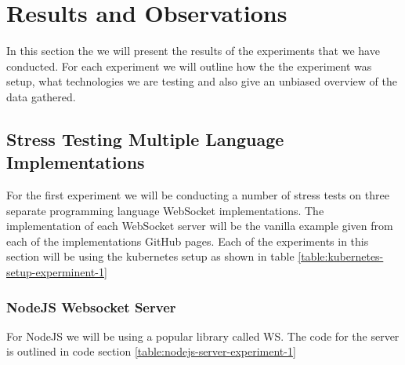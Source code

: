 \chapter{Results and Observations}

In this section the we will present the results of the experiments that we have conducted. For each experiment we will outline how the the experiment was setup, what technologies we are testing and also give an unbiased overview of the data gathered.

\section{Stress Testing Multiple Language Implementations}

For the first experiment we will be conducting a number of stress tests on three separate programming language WebSocket implementations. The implementation of each WebSocket server will be the vanilla example given from each of the implementations GitHub pages. Each of the experiments in this section will be using the  kubernetes setup as shown in table \ref{table:kubernetes-setup-experminent-1}

\begin{table}[H]
\caption{Kubernetes Setup}
\label{table:kubernetes-setup-experminent-1}
\end{table}

\subsection{NodeJS Websocket Server}

For NodeJS we will be using a popular library called WS. The code for the server is outlined in code section \ref{table:nodejs-server-experiment-1}

